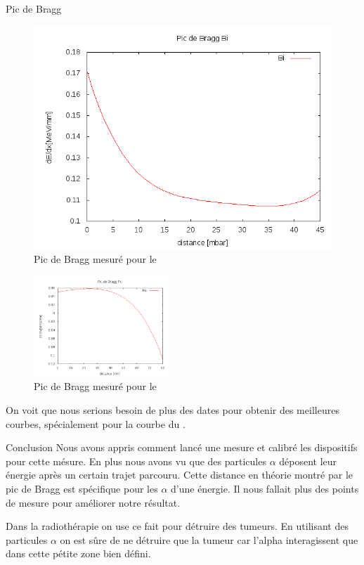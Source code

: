 \documentclass[a4paper,11pt,liststotocnumbered,bibtotocnumbered]{scrartcl}
\begin{document}
\begin{section}{Pic de Bragg}
\begin{figure}[H]
\begin{minipage}{0.45\textwidth}
    \caption{Pic de Bragg mesuré pour le }
   \end{minipage}
   \hfill
   \begin{minipage}{0.45\textwidth}
    \includegraphics[width=\textwidth]{Sabine/bi_pic.png}
    \caption{Pic de Bragg mesuré pour le }
   \end{minipage}
  \end{figure}
  \begin{figure}[H]
   \begin{center}
    \includegraphics[width=0.45\textwidth]{Sabine/po_pic.png}
   \end{center}
   \caption{Pic de Bragg mesuré pour le }
  \end{figure}
  On voit que nous serions besoin de plus des dates pour obtenir des meilleures courbes, spécialement pour la courbe du . 
 \end{section}

 
 \begin{section}{Conclusion}
  Nous avons appris comment lancé une mesure et calibré les dispositifs pour cette mésure. En plus nous avons vu que des particules $\alpha$ déposent leur énergie après un certain trajet parcouru. Cette distance en théorie montré par le pic de Bragg est spécifique pour les $\alpha$ d'une énergie. Il nous fallait plus des points de mesure pour améliorer notre résultat.
  
  Dans la radiothérapie on use ce fait pour détruire des tumeurs. En utilisant des particules $\alpha$ on est sûre de ne détruire que la tumeur car l'alpha interagissent que dans cette pétite zone bien défini.
 \end{section}
\end{document}
